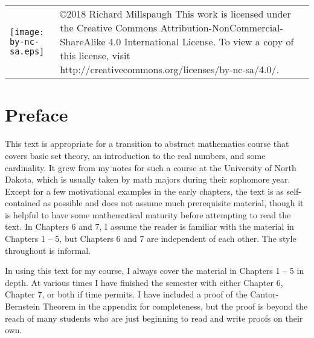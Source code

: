 
\chapter*{}

\vfill
\noindent
\begin{tabular}{ m{1.8in} m{3.7in}}
\texttt{[image: by-nc-sa.eps]}  & \copyright 2018 Richard Millspaugh \hfill\break This work is licensed under the Creative Commons Attribution-NonCommercial-ShareAlike 4.0 International License. To view a copy of this license, visit http://creativecommons.org/licenses/by-nc-sa/4.0/. \\
\end{tabular} 
\vfill

\chapter*{Preface}

This text is appropriate for a transition to abstract mathematics course that covers basic set theory, an introduction to the real numbers, and some cardinality. It grew from my notes for such a course at the University of North Dakota, which is usually taken by math majors during their sophomore year. Except for a few motivational examples in the early chapters, the text is as self-contained as possible and does not assume much prerequisite material, though it is helpful to have some mathematical maturity before attempting to read the text. In Chapters 6 and 7, I assume the reader is familiar with the material in Chapters 1 -- 5, but Chapters 6 and 7 are independent of each other. The style throughout is informal. 

In using this text for my course, I always cover the material in Chapters 1 -- 5 in depth. At various times I have finished the semester with either Chapter 6, Chapter 7, or both if time permits. I have included a proof of the Cantor-Bernstein Theorem in the appendix for completeness, but the proof is beyond the reach of many students who are just beginning to read and write proofs on their own.

\clearpage
